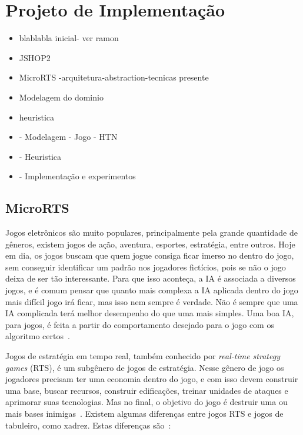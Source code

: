 
\chapter{\label{chap:proj}Projeto de Implementação}


\begin{itemize}
	\item blablabla inicial- ver ramon
	\item JSHOP2
	\item MicroRTS -arquitetura-abstraction-tecnicas presente
	\item Modelagem do dominio
	\item heuristica
\end{itemize}



\begin{itemize}
	\item - Modelagem - Jogo - HTN
	\item - Heuristica
	\item - Implementação e experimentos
\end{itemize}

\section{MicroRTS}  

Jogos eletrônicos são muito populares, principalmente pela grande quantidade de gêneros, existem jogos de ação, aventura, esportes, estratégia, entre outros. Hoje em dia, os jogos buscam que quem jogue consiga ficar imerso no dentro do jogo, sem conseguir identificar um padrão nos jogadores fictícios, pois se não o jogo deixa de ser tão interessante. Para que isso aconteça, a IA é associada a diversos jogos, e é comum pensar que quanto mais complexa a IA aplicada dentro do jogo mais difícil jogo irá ficar, mas isso nem sempre é verdade. Não é sempre que uma IA complicada terá melhor desempenho do que uma mais simples. Uma boa IA, para jogos, é feita a partir do comportamento desejado para o jogo com os algoritmo certos~\cite{millington2009artificial}.

Jogos de estratégia em tempo real, também conhecido por \textit{real-time strategy games} (RTS), é um subgênero de jogos de estratégia. Nesse gênero de jogo os jogadores precisam ter uma economia dentro do jogo, e com isso devem construir uma base, buscar recursos, construir edificações, treinar unidades de ataques e aprimorar suas tecnologias. Mas no final, o objetivo do jogo é destruir uma ou mais bases inimigas~\cite{ontanon2013survey, buro2012real}. Existem algumas diferenças entre jogos RTS e jogos de tabuleiro, como xadrez. Estas diferenças são~\cite{ontanon2013survey}:

